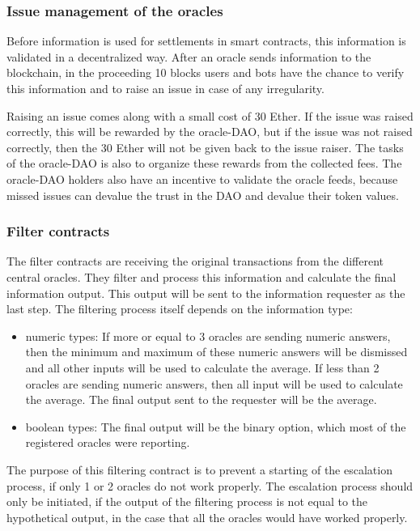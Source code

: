 \documentclass[a4paper]{article}
\begin{document}
\subsubsection{Issue management of the oracles}
Before information is used for settlements in smart contracts, this information is validated in a decentralized way. After an oracle sends information to the blockchain, in the proceeding 10 blocks users and bots have the chance to verify this information and to raise an issue in case of any irregularity. 

Raising an issue comes along with a small cost of 30 Ether. If the issue was raised correctly, this will be rewarded by the oracle-DAO, but if the issue was not raised correctly, then the 30 Ether will not be given back to the issue raiser. The tasks of the oracle-DAO is also to organize these rewards from the collected fees. The oracle-DAO holders also have an incentive to validate the oracle feeds, because missed issues can devalue the trust in the DAO and devalue their token values.  \subsubsection{Filter contracts}
\label{filtercontracts}
The filter contracts are receiving the original transactions from the different central oracles. They filter and process this information and calculate the final information output. This output will be sent to the information requester as the last step.
The filtering process itself depends on the information type:
\begin{itemize}
\item numeric types: If more or equal to 3 oracles are sending numeric answers, then the minimum and maximum of these numeric answers will be dismissed and all other inputs will be used to calculate the average. If less than 2 oracles are sending numeric answers, then all input will be used to calculate the average. The final output sent to the requester will be the average.
\item boolean types: The final output will be the binary option, which most of the registered oracles were reporting.

\end{itemize}
The purpose of this filtering contract is to prevent a starting of the escalation process, if only 1 or 2 oracles do not work properly. The escalation process should only be initiated, if the output of the filtering process is not equal to the hypothetical output, in the case that all the oracles would have worked properly. 
\end{document}
